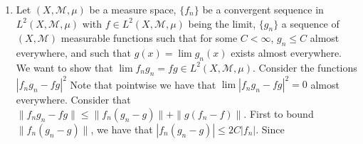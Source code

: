 \documentclass[12pt, letterpaper]{article}
\newcommand{\N}{\mathbb{N}}
\newcommand{\R}{\mathbb{R}}
\begin{document}
\begin{enumerate}
	$\|f_n\| \leq C$, and such that $\lim f_n(x) = f(x)$ a.e. We want to show that 
	$\lim \langle g, f_n\rangle = \langle g, f\rangle$.  We claim that $\{\bar{g}f_n\}_{n \in \N}$ is
	uniformly integrable.  Let $\epsilon > 0$, $E$ be a measurable set such that $\mu(E) < \delta$.  
	We want to show that $\int_E \bar{g}f d\mu < \epsilon$.  Note that 
	$\int_E |g||f_n| d\mu < \frac{1}{2} \int_E t |g|^2 + \frac{1}{t} |f|^2 d \mu \leq \frac{1}{2} \int_E t |g|^2 \mu + \frac{1}{2t}C^2$ 
	Note that if we let $t = \frac{C^2}{\epsilon}$ then we have that $\int_E |g||f_n| d\mu < \frac{1}{2} \int_E t |g|^2 \mu + \frac{\epsilon}{2}$.
	Now we are free to choose our $E$ and $\delta$ such that $\int_E |g|^2 < \frac{\epsilon^2}{C^2}$, thus ensuring that $\bar{g}f_n$ is 
	uniformly integrable.  Therefore $\lim |\langle g, f\rangle - \langle g, f_n\rangle| \leq \lim \int_\R |\bar{g}f - \bar{g} f_n| d \mu = 0$
	by Vitali's lemma, giving us $\lim \langle g, f_n\rangle = \langle g, f\rangle$
	\item Let $(X,\mathcal{M},\mu)$ be a measure space, $\{f_n\}$ be a convergent sequence in 
	$L^2(X,\mathcal{M},\mu)$ with $f \in L^2(X,\mathcal{M},\mu)$ being the limit, $\{g_n\}$ a sequence of 
	$(X, \mathcal{M})$ measurable functions such that for some $C < \infty$, $g_n \leq C$ 
	almost everywhere, and such that $g(x) = \lim g_n(x)$ exists almost everywhere.  We want to show that 
	$\lim f_ng_n = fg \in L^2(X,\mathcal{M},\mu)$.  Consider the functions $|f_ng_n - f g|^2$  Note that pointwise
	we have that $\lim |f_ng_n - f g|^2 = 0$ almost everywhere.  Consider that 
	$\|f_ng_n - f g\| \leq \| f_n (g_n-g)\| + \|g(f_n - f)\| $.  First to bound $\| f_n (g_n-g)\|$, we have that
	$|f_n (g_n-g)| \leq 2C|f_n|$. Since 
	

\end{enumerate}
\end{document}
